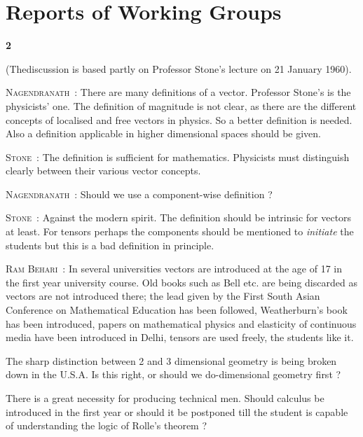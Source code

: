 \chapter{Reports of Working Groups}

\begin{center}
{\large\bf 2}
\end{center}
\medskip

\setcounter{pageoriginal}{174}
\noindent
(The\pageoriginale  discussion is based partly on Professor Stone's lecture on 21 January 1960).

\smallskip
\noindent
\textsc{Nagendranath}~: There are many definitions of a vector. Professor Stone's is the physicists' one. The definition of magnitude is not clear, as there are the different concepts of localised and free vectors in physics. So a better definition is needed. Also a definition applicable in higher dimensional spaces should be given.

\smallskip
\noindent
\textsc{Stone}~: The definition is sufficient for mathematics. Physicists must distinguish clearly between their various vector concepts.

\smallskip
\noindent
\textsc{Nagendranath}~: Should we use a component-wise definition ?

\smallskip
\noindent
\textsc{Stone}~: Against the modern spirit. The definition should be intrinsic for vectors at least. For tensors perhaps the components should be mentioned to {\em initiate} the students but this is a bad definition in principle.

\smallskip
\noindent
\textsc{Ram Behari}~: In several universities vectors are introduced at the age of 17 in the first year university course. Old books such as Bell etc. are being discarded as vectors are not introduced there; the lead given by the First South Asian Conference on Mathematical Education has been followed, Weatherburn's book has been introduced, papers on mathematical physics and elasticity of continuous media have been introduced in Delhi, tensors are used freely, the students like it.
 
The sharp distinction between 2 and 3 dimensional geometry is\break
being broken down in the U.S.A. Is this right, or should we do-dimensional geometry first ? 

There is a great necessity for producing technical men. Should calculus be introduced in the first year or should it be postponed till the student is capable of understanding the logic of Rolle's theorem ?

